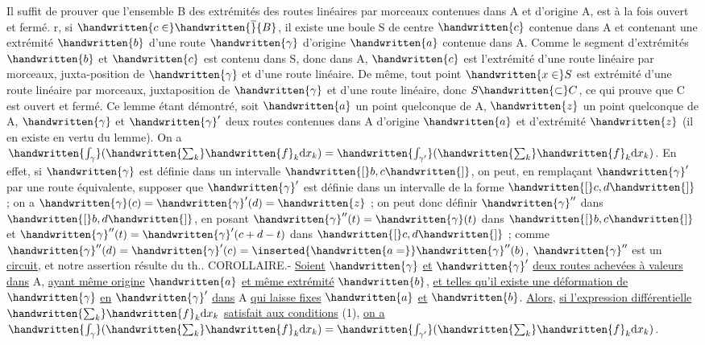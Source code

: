 Il suffit de prouver que l'ensemble B des extrémités des routes linéaires par morceaux contenues dans A et d'origine A, est à la fois ouvert et fermé. r, si $\handwritten{c\in}\handwritten{\overline}{B}$, il existe une boule S de centre $\handwritten{c}$ contenue dans A et contenant une extrémité $\handwritten{b}$ d'une route $\handwritten{\gamma}$ d'origine $\handwritten{a}$ contenue dans A. Comme le segment d'extrémités $\handwritten{b}$ et $\handwritten{c}$ est contenu dans S, donc dans A, $\handwritten{c}$ est l'extrémité d'une route linéaire par morceaux, juxta-position de $\handwritten{\gamma}$ et d'une route linéaire. De même, tout point $\handwritten{x\in}S$ est extrémité d'une route linéaire par morceaux, juxtaposition de $\handwritten{\gamma}$ et d'une route linéaire, donc $S\handwritten{\subset}C$, ce qui prouve que C est ouvert et fermé. Ce lemme étant démontré, soit $\handwritten{a}$ un point quelconque de A, $\handwritten{z}$ un point quelconque de A, $\handwritten{\gamma}$ et $\handwritten{\gamma}'$ deux routes contenues dans A d'origine $\handwritten{a}$ et d'extrémité $\handwritten{z}$ (il en existe en vertu du lemme). On a $\handwritten{\int_\gamma}(\handwritten{\sum_k}\handwritten{f}_k\mathrm{d}x_k)=\handwritten{\int_{\gamma'}}(\handwritten{\sum_k}\handwritten{f}_k\mathrm{d}x_k)$.
En effet, si $\handwritten{\gamma}$ est définie dans un intervalle $\handwritten{[}b,c\handwritten{]}$, on peut, en remplaçant $\handwritten{\gamma}'$ par une route équivalente, supposer que $\handwritten{\gamma}'$ est définie dans un intervalle de la forme $\handwritten{[}c,d\handwritten{]}$ ; on a $\handwritten{\gamma}(c)=\handwritten{\gamma}'(d)=\handwritten{z}$ ; on peut donc définir $\handwritten{\gamma}''$ dans $\handwritten{[}b,d\handwritten{]}$, en posant $\handwritten{\gamma}''(t)=\handwritten{\gamma}(t)$ dans $\handwritten{[}b,c\handwritten{]}$ et $\handwritten{\gamma}''(t)=\handwritten{\gamma}'(c+d-t)$ dans $\handwritten{[}c,d\handwritten{]}$ ; comme $\handwritten{\gamma}''(d)=\handwritten{\gamma}'(c)=\inserted{\handwritten{a=}}\handwritten{\gamma}''(b)$, $\handwritten{\gamma}''$ est un \uline{circuit}, et notre assertion résulte du th..
COROLLAIRE.- \uline{Soient} $\handwritten{\gamma}$ \uline{et} $\handwritten{\gamma}'$ \uline{deux routes achevées à valeurs dans} A, \uline{ayant même origine} $\handwritten{a}$ \uline{et même extrémité} $\handwritten{b}$, \uline{et telles qu'il existe une déformation de} $\handwritten{\gamma}$ \uline{en} $\handwritten{\gamma}'$ \uline{dans} A \uline{qui laisse fixes} $\handwritten{a}$ \uline{et} $\handwritten{b}$. \uline{Alors}, \uline{si l'expression différentielle} $\handwritten{\sum_k}\handwritten{f}_k\mathrm{d}x_k$ \uline{satisfait aux conditions} (1), \uline{on a} $\handwritten{\int_\gamma}(\handwritten{\sum_k}\handwritten{f}_k\mathrm{d}x_k)=\handwritten{\int_{\gamma'}}(\handwritten{\sum_k}\handwritten{f}_k\mathrm{d}x_k)$.


